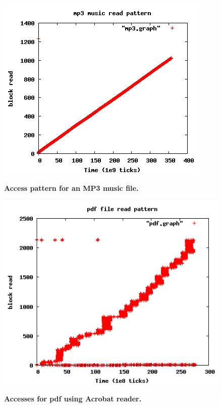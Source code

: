 \documentclass[twocolumn,10pt]{article}
\begin{document}
\begin{figure}[t!!]
\centering \resizebox{!}{2.8in}
{\includegraphics{filetype-mp3-graph.png}}
\caption{\small \bf Access pattern for an MP3 music file.}
\label{fig:filetype-mp3-graph}
\end{figure}

\begin{figure}[t!!]
\centering \resizebox{!}{2.8in}
{\includegraphics{filetype-pdf-adobe-graph.png}}
\caption{\small \bf Accesses for pdf using Acrobat reader.}
\label{fig:filetype-pdf-adobe-graph}
\end{figure}
\end{document}
